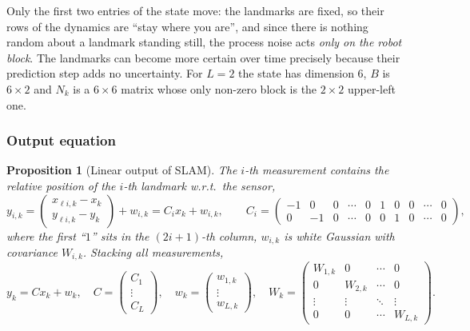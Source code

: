\documentclass[11pt,a4paper]{article}
\def\bm#1{#1}%
\theoremstyle{definition}
\theoremstyle{plain}
\newtheorem{proposition}[definition]{Proposition}
\theoremstyle{remark}
\begin{document}
\begin{intuition}
Only the first two entries of the state move: the landmarks are fixed, so their rows of the dynamics are ``stay where you are'', and since there is nothing random about a landmark standing still, the process noise acts \emph{only on the robot block}. The landmarks can become more certain over time precisely because their prediction step adds no uncertainty. For $L=2$ the state has dimension $6$, $\bm B$ is $6\times2$ and $\bm N_k$ is a $6\times6$ matrix whose only non-zero block is the $2\times2$ upper-left one.
\end{intuition}

\subsubsection*{Output equation}
\begin{proposition}[Linear output of SLAM]
\label{prop:slamout}
The $i$-th measurement contains the relative position of the $i$-th landmark w.r.t.\ the sensor,
\[
\bm y_{i,k}=\begin{pmatrix}x_{\ell i,k}-x_k\\y_{\ell i,k}-y_k\end{pmatrix}+\bm w_{i,k}=\bm C_i\bm x_k+\bm w_{i,k},\qquad
\bm C_i=\begin{pmatrix}-1&0&0&\cdots&0&1&0&0&\cdots&0\\0&-1&0&\cdots&0&0&1&0&\cdots&0\end{pmatrix},
\]
where the first ``$1$'' sits in the $(2i+1)$-th column, $\bm w_{i,k}$ is white Gaussian with covariance $\bm W_{i,k}$. Stacking all measurements,
\[
\bm y_k=\bm C\bm x_k+\bm w_k,\quad
\bm C=\begin{pmatrix}\bm C_1\\\vdots\\\bm C_L\end{pmatrix},\quad
\bm w_k=\begin{pmatrix}\bm w_{1,k}\\\vdots\\\bm w_{L,k}\end{pmatrix},\quad
\bm W_k=\begin{pmatrix}\bm W_{1,k}&\bm 0&\cdots&\bm 0\\\bm 0&\bm W_{2,k}&\cdots&\bm 0\\\vdots&\vdots&\ddots&\vdots\\\bm 0&\bm 0&\cdots&\bm W_{L,k}\end{pmatrix}.
\]
\end{proposition}
\end{document}
